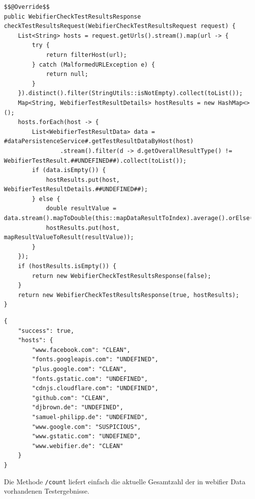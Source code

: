 \begin{scriptsize}
\begin{lstlisting}
$$@Override$$
public WebifierCheckTestResultsResponse checkTestResultsRequest(WebifierCheckTestResultsRequest request) {
    List<String> hosts = request.getUrls().stream().map(url -> {
        try {
            return filterHost(url);
        } catch (MalformedURLException e) {
            return null;
        }
    }).distinct().filter(StringUtils::isNotEmpty).collect(toList());
    Map<String, WebifierTestResultDetails> hostResults = new HashMap<>();
    hosts.forEach(host -> {
        List<WebifierTestResultData> data = #dataPersistenceService#.getTestResultDataByHost(host)
                .stream().filter(d -> d.getOverallResultType() != WebifierTestResult.##UNDEFINED##).collect(toList());
        if (data.isEmpty()) {
            hostResults.put(host, WebifierTestResultDetails.##UNDEFINED##);
        } else {
            double resultValue = data.stream().mapToDouble(this::mapDataResultToIndex).average().orElse(1);
            hostResults.put(host, mapResultValueToResult(resultValue));
        }
    });
    if (hostResults.isEmpty()) {
        return new WebifierCheckTestResultsResponse(false);
    }
    return new WebifierCheckTestResultsResponse(true, hostResults);
}
\end{lstlisting}
\end{scriptsize}

\begin{scriptsize}
\begin{lstlisting}
{
    "success": true,
    "hosts": {
        "www.facebook.com": "CLEAN",
        "fonts.googleapis.com": "UNDEFINED",
        "plus.google.com": "CLEAN",
        "fonts.gstatic.com": "UNDEFINED",
        "cdnjs.cloudflare.com": "UNDEFINED",
        "github.com": "CLEAN",
        "djbrown.de": "UNDEFINED",
        "samuel-philipp.de": "UNDEFINED",
        "www.google.com": "SUSPICIOUS",
        "www.gstatic.com": "UNDEFINED",
        "www.webifier.de": "CLEAN"
    }
}
\end{lstlisting}
\end{scriptsize}

Die Methode \lstinline[style=eclipse]{/count} liefert einfach die aktuelle Gesamtzahl der in webifier Data vorhandenen Testergebnisse.

